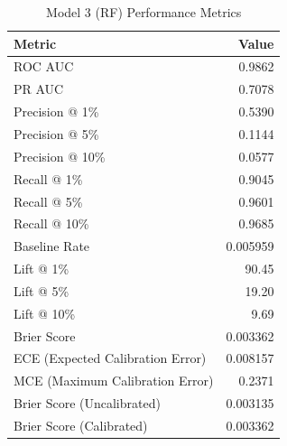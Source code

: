 \begin{table}[h]
\centering
\begin{tabular}{lr}
\toprule
Metric & Value \\
\midrule
ROC AUC & 0.9862 \\
PR AUC & 0.7078 \\
Precision @ 1\% & 0.5390 \\
Precision @ 5\% & 0.1144 \\
Precision @ 10\% & 0.0577 \\
Recall @ 1\% & 0.9045 \\
Recall @ 5\% & 0.9601 \\
Recall @ 10\% & 0.9685 \\
Baseline Rate & 0.005959 \\
Lift @ 1\% & 90.45 \\
Lift @ 5\% & 19.20 \\
Lift @ 10\% & 9.69 \\
Brier Score & 0.003362 \\
ECE (Expected Calibration Error) & 0.008157 \\
MCE (Maximum Calibration Error) & 0.2371 \\
Brier Score (Uncalibrated) & 0.003135 \\
Brier Score (Calibrated) & 0.003362 \\
\bottomrule
\end{tabular}
\caption{Model 3 (RF) Performance Metrics}
\label{tab:model3_rf_metrics}
\end{table}
